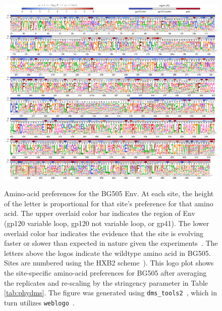 \documentclass[9pt]{elife}
\begin{document}
\begin{figure}
\begin{fullwidth}
{\includegraphics[width=1.3\textwidth]{figures/BG505_prefs.pdf}}
\caption{\label{fig:BG505prefs}
Amino-acid preferences for the BG505 Env.
At each site, the height of the letter is proportional for that site's preference for that amino acid.
The upper overlaid color bar indicates the region of Env (gp120 variable loop, gp120 not variable loop, or gp41).
The lower overlaid color bar indicates the evidence that the site is evolving faster or slower than expected in nature given the experiments~\citep[see][]{bloom2017identification}.
The letters above the logos indicate the wildtype amino acid in BG505.
Sites are numbered using the HXB2 scheme~\citep{korber1998numbering}).
This logo plot shows the site-specific amino-acid preferences for BG505 after averaging the replicates and re-scaling by the stringency parameter in Table \ref{tab:phydms}.
The figure was generated using \texttt{dms\_tools2}~\citep[\url{https://jbloomlab.github.io/dms_tools2/}]{bloom2015software}, which in turn utilizes \texttt{weblogo}~\citep{crooks2004weblogo}.
}
\end{fullwidth}
\end{figure}
\end{document}

